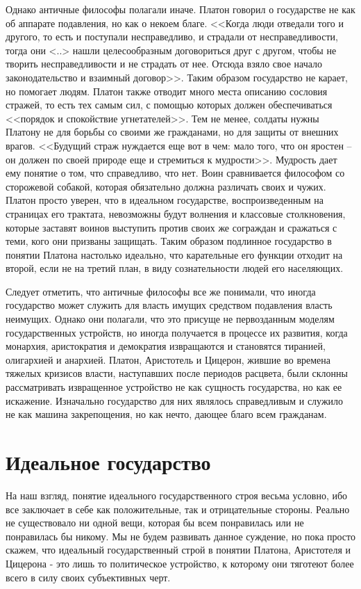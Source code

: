 	Однако античные философы полагали иначе. Платон говорил о государстве 
	не как об аппарате подавления, но как о некоем благе. <<Когда люди 
	отведали того и другого, то есть и поступали несправедливо, и 
	страдали от несправедливости, тогда они <..> нашли целесообразным 
	договориться друг с другом, чтобы не творить несправедливости и не 
	страдать от нее. Отсюда взяло свое начало законодательство и взаимный 
	договор>>. Таким образом государство не карает, но помогает людям. 
	Платон также отводит много места описанию сословия стражей, то есть 
	тех самым сил, с помощью которых должен обеспечиваться <<порядок и 
	спокойствие угнетателей>>. Тем не менее, солдаты нужны Платону не для 
	борьбы со своими же гражданами, но для защиты от внешних врагов. 
	<<Будущий страж нуждается еще вот в чем: мало того, что он яростен -- 
	он должен по своей природе еще и стремиться к мудрости>>. Мудрость дает 
	ему понятие о том, что справедливо, что нет. Воин сравнивается философом 
	со сторожевой собакой, которая обязательно должна различать своих и чужих. 
	Платон просто уверен, что в идеальном государстве, воспроизведенным на 
	страницах его трактата, невозможны будут волнения и классовые 
	столкновения, которые заставят воинов выступить против своих же сограждан 
	и сражаться с теми, кого они призваны защищать. Таким образом подлинное 
	государство в понятии Платона настолько идеально, что карательные его 
	функции отходит на второй, если не на третий план, в виду сознательности 
	людей его населяющих.

	Следует отметить, что античные философы все же понимали, что иногда 
	государство может служить для власть имущих средством подавления власть 
	неимущих. Однако они полагали, что это присуще не первозданным моделям 
	государственных устройств, но иногда получается в процессе их развития, 
	когда монархия, аристократия и демократия извращаются и становятся 
	тиранией, олигархией и анархией. Платон, Аристотель и Цицерон, жившие 
	во времена тяжелых кризисов власти, наступавших после периодов расцвета, 
	были склонны рассматривать извращенное устройство не как сущность 
	государства, но как ее искажение. Изначально государство для них являлось 
	справедливым и служило не как машина закрепощения, но как нечто, дающее 
	благо всем гражданам.

\pagebreak
\chapter{Идеальное государство}

	На наш взгляд, понятие идеального государственного строя весьма условно, 
	ибо все заключает в себе как положительные, так и отрицательные стороны. 
	Реально не существовало ни одной вещи, которая бы всем понравилась или не 
	понравилась бы никому. Мы не будем развивать данное суждение, но пока 
	просто скажем, что идеальный государственный строй в понятии Платона, 
	Аристотеля и Цицерона - это лишь то политическое устройство, к которому 
	они тяготеют более всего в силу своих субъективных черт.

